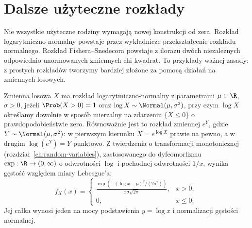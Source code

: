 \section{Dalsze użyteczne rozkłady}
Nie wszystkie użyteczne rodziny wymagają nowej konstrukcji od zera.
Rozkład logarytmiczno-normalny powstaje przez wykładnicze przekształcenie
rozkładu normalnego. Rozkład Fishera--Snedecora powstaje z ilorazu
dwóch niezależnych odpowiednio unormowanych zmiennych chi-kwadrat.
To przykłady ważnej zasady: z prostych rozkładów tworzymy
bardziej złożone za pomocą działań na zmiennych losowych.

\begin{definicja}
Zmienna losowa $X$ ma rozkład logarytmiczno-normalny
z parametrami $\mu\in\R$, $\sigma>0$, jeżeli $\Prob(X>0)=1$
oraz $\log X\sim\Normal(\mu,\sigma^2)$, przy czym
$\log X$ określamy dowolnie w sposób mierzalny na
zdarzeniu $\{X\leq0\}$ o prawdopodobieństwie zero.
Równoważnie jest to rozkład zmiennej $e^Y$, gdzie
$Y\sim\Normal(\mu,\sigma^2)$: w pierwszym kierunku
$X=e^{\log X}$ prawie na pewno, a w drugim
$\log(e^Y)=Y$ punktowo.
Z twierdzenia o transformacji monotonicznej
(rozdział~\ref{ch:random-variables}), zastosowanego do
dyfeomorfizmu $\exp:\R\to(0,\infty)$ o odwrotności
$\log$ i pochodnej odwrotności $1/x$, wynika gęstość
względem miary Lebesgue'a:
\[
f_X(x)=
\begin{cases}
\displaystyle\frac{\exp(-(\log x-\mu)^2/(2\sigma^2))}
{x\sigma\sqrt{2\pi}},&x>0,\\
0,&x\leq0.
\end{cases}
\]
Jej całka wynosi jeden na mocy podstawienia $y=\log x$
i normalizacji gęstości normalnej.
\end{definicja}

